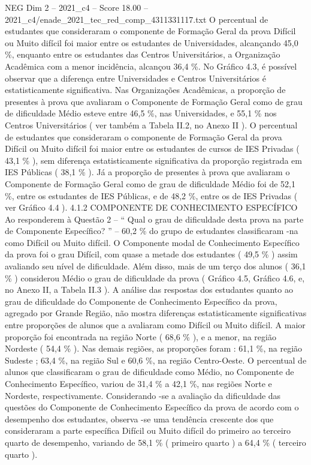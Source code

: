 \begin{textsample}{NEG Dim 2 – 2021\_c4 – Score 18.00 – 2021\_c4/enade\_2021\_tec\_red\_comp\_4311331117.txt}
O percentual de estudantes que consideraram o componente de Formação Geral da prova Difícil ou Muito difícil foi maior entre os estudantes de Universidades, alcançando 45,0 \%, enquanto entre os estudantes das Centros Universitários, a Organização Acadêmica com a menor incidência, alcançou 36,4 \%.
No Gráfico 4.3, é possível observar que a diferença entre Universidades e Centros Universitários é estatisticamente significativa.
Nas Organizações Acadêmicas, a proporção de presentes à prova que avaliaram o Componente de Formação Geral como de grau de dificuldade Médio esteve entre 46,5 \%, nas Universidades, e 55,1 \% nos Centros Universitários ( ver também a Tabela II.2, no Anexo II ).
O percentual de estudantes que consideraram o componente de Formação Geral da prova Difícil ou Muito difícil foi maior entre os estudantes de cursos de IES Privadas ( 43,1 \% ), sem diferença estatisticamente significativa da proporção registrada em IES Públicas ( 38,1 \% ).
Já a proporção de presentes à prova que avaliaram o Componente de Formação Geral como de grau de dificuldade Médio foi de 52,1 \%, entre os estudantes de IES Públicas, e de 48,2 \%, entre os de IES Privadas ( ver Gráfico 4.4 ). 4.1.2 COMPONENTE DE CONHECIMENTO ESPECÍFICO Ao responderem à Questão 2 – “ Qual o grau de dificuldade desta prova na parte de Componente Específico? ” – 60,2 \% do grupo de estudantes classificaram -na como Difícil ou Muito difícil.
O Componente modal de Conhecimento Específico da prova foi o grau Difícil, com quase a metade dos estudantes ( 49,5 \% ) assim avaliando seu nível de dificuldade.
Além disso, mais de um terço dos alunos ( 36,1 \% ) considerou Médio o grau de dificuldade da prova ( Gráfico 4.5, Gráfico 4.6, e, no Anexo II, a Tabela II.3 ).
A análise das respostas dos estudantes quanto ao grau de dificuldade do Componente de Conhecimento Específico da prova, agregado por Grande Região, não mostra diferenças estatisticamente significativas entre proporções de alunos que a avaliaram como Difícil ou Muito difícil.
A maior proporção foi encontrada na região Norte ( 68,6 \% ), e a menor, na região Nordeste ( 54,4 \% ).
Nas demais regiões, as proporções foram : 61,1 \%, na região Sudeste ; 63,4 \%, na região Sul e 60,6 \%, na região Centro-Oeste.
O percentual de alunos que classificaram o grau de dificuldade como Médio, no Componente de Conhecimento Específico, variou de 31,4 \% a 42,1 \%, nas regiões Norte e Nordeste, respectivamente.
Considerando -se a avaliação da dificuldade das questões do Componente de Conhecimento Específico da prova de acordo com o desempenho dos estudantes, observa -se uma tendência crescente dos que consideraram a parte específica Difícil ou Muito difícil do primeiro ao terceiro quarto de desempenho, variando de 58,1 \% ( primeiro quarto ) a 64,4 \% ( terceiro quarto ).

\end{textsample}
